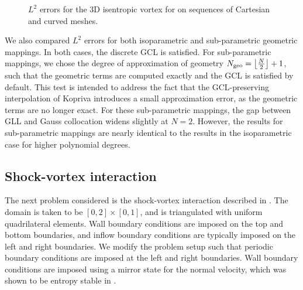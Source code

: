 \documentclass[review,onefignum,onetabnum,final]{siamart171218}
\newcommand{\note}[1]{{\color{blue}{#1}}}
\begin{document}
\begin{figure}
{
}
\caption{$L^2$ errors for the 3D isentropic vortex for \note{$N = 2,\ldots,5$} on sequences of Cartesian and curved meshes.}
\label{fig:err3d}
\end{figure}

We also compared $L^2$ errors for both isoparametric and sub-parametric geometric mappings.  In both cases, the discrete GCL is satisfied.  For sub-parametric mappings, we chose the degree of approximation of geometry $N_{\rm geo} = \left\lfloor\frac{N}{2} \right\rfloor + 1$, such that the geometric terms are computed exactly and the GCL is satisfied by default.   This test is intended to address the fact that the GCL-preserving interpolation of Kopriva introduces a small approximation error, as the geometric terms are no longer exact.  For these sub-parametric mappings, the gap between GLL and Gauss collocation widens slightly at $N=2$.  However, the results for sub-parametric mappings are nearly identical to the results in the isoparametric case for higher polynomial degrees.  


\subsection{Shock-vortex interaction}

The next problem considered is the shock-vortex interaction described in \cite{shu1998essentially}.  The domain is taken to be $[0,2]\times [0,1]$, and is triangulated with uniform quadrilateral elements.  Wall boundary conditions are imposed on the top and bottom boundaries, and inflow boundary conditions are typically imposed on the left and right boundaries.  We modify the problem setup such that periodic boundary conditions are imposed at the left and right boundaries.  Wall boundary conditions are imposed using a mirror state for the normal velocity, which was shown to be entropy stable in \cite{svard2014entropy, chen2017entropy}.  
\end{document}
